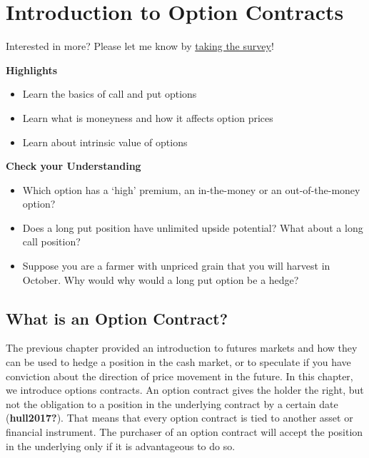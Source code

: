 \documentclass[
  letterpaper,
  DIV=11,
  numbers=noendperiod]{scrreprt}
\begin{document}

\hypertarget{introduction-to-option-contracts}{%
\chapter{Introduction to Option
Contracts}\label{introduction-to-option-contracts}}

{Interested in more? Please let me know by}
\href{https://forms.gle/Q3VByCQZHjfQSy9D7}{taking the survey}!

\textbf{Highlights}

\begin{itemize}
\item
  Learn the basics of call and put options
\item
  Learn what is moneyness and how it affects option prices
\item
  Learn about intrinsic value of options
\end{itemize}

\textbf{Check your Understanding}

\begin{itemize}
\item
  Which option has a `high' premium, an in-the-money or an
  out-of-the-money option?
\item
  Does a long put position have unlimited upside potential? What about a
  long call position?
\item
  Suppose you are a farmer with unpriced grain that you will harvest in
  October. Why would why would a long put option be a hedge?
\end{itemize}

\hypertarget{what-is-an-option-contract}{%
\section{What is an Option Contract?}\label{what-is-an-option-contract}}

The previous chapter provided an introduction to futures markets and how
they can be used to hedge a position in the cash market, or to speculate
if you have conviction about the direction of price movement in the
future. In this chapter, we introduce options contracts. An option
contract gives the holder the right, but not the obligation to a
position in the underlying contract by a certain date
(\textbf{hull2017?}). That means that every option contract is tied to
another asset or financial instrument. The purchaser of an option
contract will accept the position in the underlying only if it is
advantageous to do so.
\end{document}
